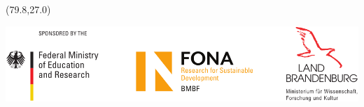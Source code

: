 \documentclass[19pt]{beamer}
\begin{document}
\begin{frame}
%
        \begin{textblock}{20}(79.8,27.0)
            \begin{WhiteBox}
                \vspace{-1cm}
                \begin{block}{}
                    \includegraphics[width=\textwidth]{img/Sponsor_logos}
                \end{block}
            \end{WhiteBox}
        \end{textblock}
    \end{frame}
\end{document}
